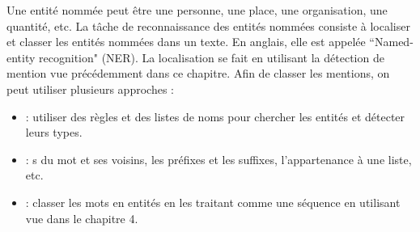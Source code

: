 \documentclass{KodeBook}
\begin{document}
Une entité nommée peut être une personne, une place, une organisation, une quantité, etc.
La tâche de reconnaissance des entités nommées consiste à localiser et classer les entités nommées dans un texte. 
En anglais, elle est appelée ``Named-entity recognition" (NER). 
La localisation se fait en utilisant la détection de mention vue précédemment dans ce chapitre.
Afin de classer les mentions, on peut utiliser plusieurs approches :
\begin{itemize}
	\item {} : utiliser des règles et des listes de noms pour chercher les entités et détecter leurs types.
	\item {} : s du mot et ses voisins, les préfixes et les suffixes, l'appartenance à une liste, etc.
	\item {} : classer les mots en entités en les traitant comme une séquence en utilisant  vue dans le chapitre 4.
	
\end{itemize}
\end{document}
